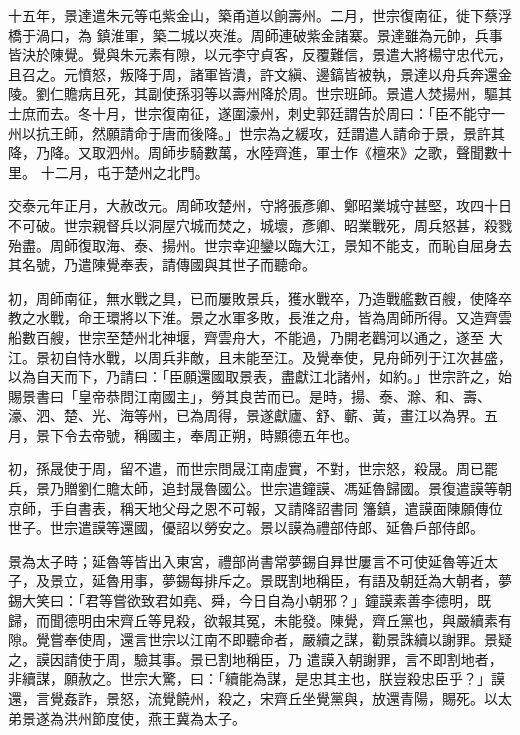\begin{pinyinscope}
 十五年，景達遣朱元等屯紫金山，築甬道以餉壽州。二月，世宗復南征，徙下蔡浮橋于渦口，為
 鎮淮軍，築二城以夾淮。周師連破紫金諸寨。景達雖為元帥，兵事皆決於陳覺。覺與朱元素有隙，以元李守貞客，反覆難信，景遣大將楊守忠代元，且召之。元憤怒，叛降于周，諸軍皆潰，許文縝、邊鎬皆被執，景達以舟兵奔還金陵。劉仁贍病且死，其副使孫羽等以壽州降於周。世宗班師。景遣人焚揚州，驅其士庶而去。冬十月，世宗復南征，遂圍濠州，刺史郭廷謂告於周曰：「臣不能守一州以抗王師，然願請命于唐而後降。」世宗為之緩攻，廷謂遣人請命于景，景許其降，乃降。又取泗州。周師步騎數萬，水陸齊進，軍士作《檀來》之歌，聲聞數十里。
 十二月，屯于楚州之北門。



 交泰元年正月，大赦改元。周師攻楚州，守將張彥卿、鄭昭業城守甚堅，攻四十日不可破。世宗親督兵以洞屋穴城而焚之，城壞，彥卿、昭業戰死，周兵怒甚，殺戮殆盡。周師復取海、泰、揚州。世宗幸迎鑾以臨大江，景知不能支，而恥自屈身去其名號，乃遣陳覺奉表，請傳國與其世子而聽命。



 初，周師南征，無水戰之具，已而屢敗景兵，獲水戰卒，乃造戰艦數百艘，使降卒教之水戰，命王環將以下淮。景之水軍多敗，長淮之舟，皆為周師所得。又造齊雲船數百艘，世宗至楚州北神堰，齊雲舟大，不能過，乃開老鸛河以通之，遂至
 大江。景初自恃水戰，以周兵非敵，且未能至江。及覺奉使，見舟師列于江次甚盛，以為自天而下，乃請曰：「臣願還國取景表，盡獻江北諸州，如約。」世宗許之，始賜景書曰「皇帝恭問江南國主」，勞其良苦而已。是時，揚、泰、滁、和、壽、濠、泗、楚、光、海等州，已為周得，景遂獻廬、舒、蘄、黃，畫江以為界。五月，景下令去帝號，稱國主，奉周正朔，時顯德五年也。



 初，孫晟使于周，留不遣，而世宗問晟江南虛實，不對，世宗怒，殺晟。周已罷兵，景乃贈劉仁贍太師，追封晟魯國公。世宗遣鐘謨、馮延魯歸國。景復遣謨等朝京師，手自書表，稱天地父母之恩不可報，又請降詔書同
 籓鎮，遣謨面陳願傳位世子。世宗遣謨等還國，優詔以勞安之。景以謨為禮部侍郎、延魯戶部侍郎。



 景為太子時；延魯等皆出入東宮，禮部尚書常夢錫自昪世屢言不可使延魯等近太子，及景立，延魯用事，夢錫每排斥之。景既割地稱臣，有語及朝廷為大朝者，夢錫大笑曰：「君等嘗欲致君如堯、舜，今日自為小朝邪？」鐘謨素善李德明，既歸，而聞德明由宋齊丘等見殺，欲報其冤，未能發。陳覺，齊丘黨也，與嚴續素有隙。覺嘗奉使周，還言世宗以江南不即聽命者，嚴續之謀，勸景誅續以謝罪。景疑之，謨因請使于周，驗其事。景已割地稱臣，乃
 遣謨入朝謝罪，言不即割地者，非續謀，願赦之。世宗大驚，曰：「續能為謀，是忠其主也，朕豈殺忠臣乎？」謨還，言覺姦詐，景怒，流覺饒州，殺之，宋齊丘坐覺黨與，放還青陽，賜死。以太弟景遂為洪州節度使，燕王冀為太子。




\end{pinyinscope}
